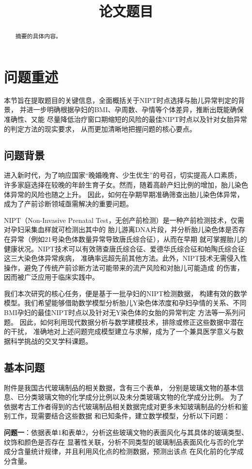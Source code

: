 \documentclass{cumcmthesis}
\title{论文题目}
\begin{document}
        \maketitle
        \begin{abstract}
            摘要的具体内容。
        \end{abstract}
        \section{问题重述}
        本节旨在提取题目的关键信息，全面概括关于NIPT时点选择与胎儿异常判定的背景，
        并进一步明确根据孕妇的BMI、孕周数、孕情等个体差异，推断出既能确保准确性、又能
        尽量降低治疗窗口期缩短的风险的最佳NIPT时点以及针对女胎异常的判定方法的现实要求，
        从而更加清晰地把握问题的核心要点。

        \subsection{问题背景}
        
        进入新时代，为了响应国家“晚婚晚育、少生优生”的号召，切实提高人口素质，
        许多家庭选择在较晚的年龄生育子女。然而，随着高龄产妇比例的增加，胎儿染色体异常的风险也随之上升。
        因此，如何在孕期早期准确筛查出胎儿染色体异常，成为了产前诊断领域亟需解决的重要问题。
        \par 
        NIPT（Non-Invasive Prenatal Test，无创产前检测）是一种产前检测技术，仅需对孕妇采集血样就可检测出其中的
        胎儿游离DNA片段，并分析胎儿染色体是否存在异常（例如21号染色体数量异常导致唐氏综合征），从而在早期
        就可掌握胎儿的健康状况。NIPT技术可以有效筛查唐氏综合征、爱德华氏综合征和帕陶氏综合征这三大染色体异常疾病，
        准确率远超先前其他方法。此外，NIPT技术无需侵入性操作，避免了传统产前诊断方法可能带来的流产风险和对胎儿可能造成
        的伤害，因而被广泛应用于临床实践中。
        \par 我们本次研究的核心任务，便是基于一批孕妇的NIPT检测数据，
        构建有效的数学模型。我们希望能够借助数学模型分析胎儿Y染色体浓度和孕妇孕情的关系、不同BMI孕妇的最佳NIPT时点以及针对无Y染色体的女胎的异常判定
        方法等一系列问题。
        因此，如何利用现代数据分析与数学建模技术，排除或修正这些数据中潜在的干扰，
        准确地对上述问题完成模型建立与求解，成为了一个兼具医学意义与数据科学挑战的交叉学科课题。
        
        \subsection{基本问题}
        附件是我国古代玻璃制品的相关数据，含有三个表单，
        分别是玻璃文物的基本信息、已分类玻璃文物的化学成分比例以及未分类玻璃文物的化学成分比例。
        为了依据考古工作者得到的古代玻璃制品相关数据完成对更多未知玻璃制品的分析和鉴别工作，现需要结合这些数据
        和已知条件，建立数学模型，分析以下问题：
        \par \textbf{问题一}：依据表单1和表单2，分析这些玻璃文物的表面风化与其具体的玻璃类型、纹饰和颜色是否存在
        显著性关联，分析不同类型的玻璃制品表面风化与否的化学成分含量统计规律，并且利用风化点的检测数据，预测出该点
        在风化前的化学成分含量。
\end{document}
